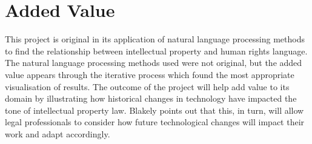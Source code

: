 		\section{Added Value}
			This project is original in its application of natural language processing methods to find the relationship between intellectual property and human rights language. The natural language processing methods used were not original, but the added value appears through the iterative process which found the most appropriate visualisation of results. The outcome of the project will help add value to its domain by illustrating how historical changes in technology have impacted the tone of intellectual property law. Blakely points out that this, in turn, will allow legal professionals to consider how future technological changes will impact their work and adapt accordingly.
